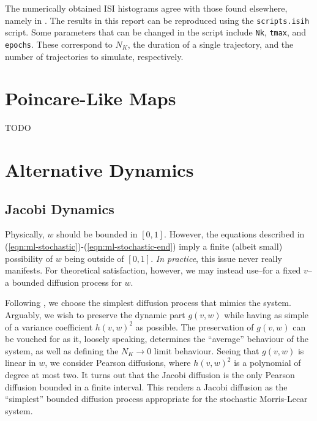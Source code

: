 \documentclass[letterpaper,12pt]{article}
\numberwithin{table}{section}
\numberwithin{figure}{section}
\numberwithin{equation}{section}
\begin{document}
\begin{flushleft}
    The numerically obtained ISI histograms agree with those found elsewhere, namely in \cite{rowat}. The results in this report can be reproduced using the \texttt{scripts.isih} script. Some parameters that can be changed in the script include \texttt{Nk}, \texttt{tmax}, and \texttt{epochs}. These correspond to $N_K$, the duration of a single trajectory, and the number of trajectories to simulate, respectively.

    \pagebreak

    \section{Poincare-Like Maps} %
    TODO

    \pagebreak

    \section{Alternative Dynamics}

    \subsection{Jacobi Dynamics}

    Physically, $w$ should be bounded in $[0, 1]$. However, the equations described in (\ref{eqn:ml-stochastic})-(\ref{eqn:ml-stochastic-end}) imply a finite (albeit small) possibility of $w$ being outside of $[0, 1]$. \textit{In practice}, this issue never really manifests. For theoretical satisfaction, however, we may instead use--for a fixed $v$--a bounded diffusion process for $w$.

    Following \cite{dg}, we choose the simplest diffusion process that mimics the system. Arguably, we wish to preserve the dynamic part $g(v, w)$ while having as simple of a variance coefficient $h(v, w)^2$ as possible. The preservation of $g(v, w)$ can be vouched for as it, loosely speaking, determines the ``average'' behaviour of the system, as well as defining the $N_K \to 0$ limit behaviour. Seeing that $g(v, w)$ is linear in $w$, we consider Pearson diffusions, where $h(v, w)^2$ is a polynomial of degree at most two. It turns out that the Jacobi diffusion is the only Pearson diffusion bounded in a finite interval. This renders a Jacobi diffusion as the ``simplest'' bounded diffusion process appropriate for the stochastic Morris-Lecar system.


\end{flushleft}
\end{document}
